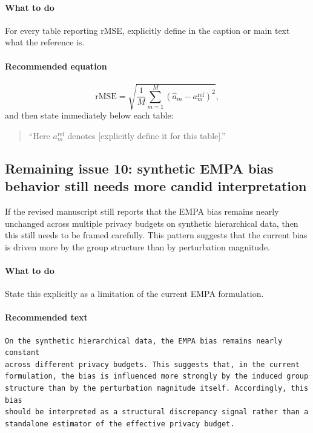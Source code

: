 \documentclass[11pt]{article}
\begin{document}
\paragraph{What to do}
For every table reporting rMSE, explicitly define in the caption or main text what the reference is.

\paragraph{Recommended equation}
\begin{equation}
\mathrm{rMSE}
=
\sqrt{
\frac{1}{M}
\sum_{m=1}^{M}
\left(
\hat{a}_m - a_m^{\mathrm{ref}}
\right)^2
},
\label{eq:rmse-remaining}
\end{equation}
and then state immediately below each table:
\begin{quote}
``Here \(a_m^{\mathrm{ref}}\) denotes [explicitly define it for this table].''
\end{quote}

\subsection*{Remaining issue 10: synthetic EMPA bias behavior still needs more candid interpretation}
If the revised manuscript still reports that the EMPA bias remains nearly unchanged across multiple privacy budgets on synthetic hierarchical data, then this still needs to be framed carefully. This pattern suggests that the current bias is driven more by the group structure than by perturbation magnitude.

\paragraph{What to do}
State this explicitly as a limitation of the current EMPA formulation.

\paragraph{Recommended text}
\begin{verbatim}
On the synthetic hierarchical data, the EMPA bias remains nearly constant
across different privacy budgets. This suggests that, in the current
formulation, the bias is influenced more strongly by the induced group
structure than by the perturbation magnitude itself. Accordingly, this bias
should be interpreted as a structural discrepancy signal rather than a
standalone estimator of the effective privacy budget.
\end{verbatim}
\end{document}
